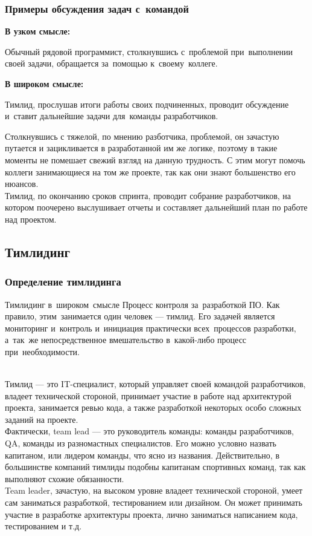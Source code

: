 \documentclass{../industrial-development}
\begin{document}
\begin{frame} \frametitle{Примеры обсуждения задач с~командой}
	\begin{minipage}{0.47\textwidth}
		\textbf{В узком смысле:}
		
		Обычный рядовой программист, столкнувшись с~проблемой при~выполнении своей задачи, обращается за~помощью к~своему~коллеге.
	\end{minipage}
	\hfill
	\begin{minipage}{0.5\textwidth}
		\textbf{В широком смысле:}
		
		Тимлид, прослушав итоги работы своих подчиненных, проводит обсуждение и~ставит дальнейшие задачи для~команды разработчиков.
	\end{minipage}
\end{frame}
\lecturenotes
Столкнувшись с тяжелой, по мнению разботчика, проблемой, он зачастую путается и зацикливается в разработанной им же логике, поэтому в такие моменты не помешает свежий взгляд на данную трудность. С этим могут помочь коллеги занимающиеся на том же проекте, так как они знают большенство его нюансов.\\
Тимлид, по окончанию сроков спринта, проводит собрание разработчиков, на котором поочерено выслушивает отчеты и составляет дальнейший план по работе над проектом.\\

\subsection{Тимлидинг}
\begin{frame} \frametitle{Определение тимлидинга}
	\begin{block}{Тимлидинг в~широком~смысле}
		Процесс контроля за~разработкой ПО. Как правило, этим~занимается один человек --- тимлид. Его задачей является мониторинг и~контроль и~инициация практически всех~процессов разработки, а~так~же непосредственное вмешательство в~какой-либо процесс при~необходимости.
	\end{block}
\end{frame}
\lecturenotes
\\Тимлид — это IT-специалист, который управляет своей командой разработчиков, владеет технической стороной, принимает участие в работе над архитектурой проекта, занимается ревью кода, а также разработкой некоторых особо сложных заданий на проекте.\\
Фактически, team lead — это руководитель команды: команды разработчиков, QA, команды из разномастных специалистов. Его можно условно назвать капитаном, или лидером команды, что ясно из названия. Действительно, в большинстве компаний тимлиды подобны капитанам спортивных команд, так как выполняют схожие обязанности.\\
Team leader, зачастую, на высоком уровне владеет технической стороной, умеет сам заниматься разработкой, тестированием или дизайном. Он может принимать участие в разработке архитектуры проекта, лично заниматься написанием кода, тестированием и т.д.\\
\end{document}
